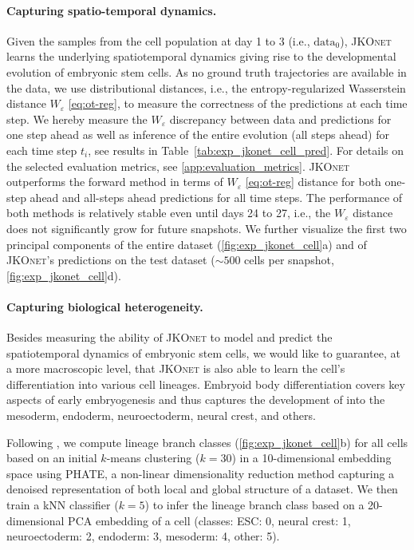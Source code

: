\paragraph{Capturing spatio-temporal dynamics.}
Given the samples from the cell population at day 1 to 3 (i.e., $\mathrm{data}_0$), \textsc{JKOnet} learns the underlying spatiotemporal dynamics giving rise to the developmental evolution of embryonic stem cells. 
As no ground truth trajectories are available in the data, we use distributional distances, i.e., the entropy-regularized Wasserstein distance $W_\varepsilon$ \eqref{eq:ot-reg}, to measure the correctness of the predictions at each time step. 
We hereby measure the $W_\varepsilon$ discrepancy between data and predictions for one step ahead as well as inference of the entire evolution (all steps ahead) for each time step $t_i$, see results in Table~\ref{tab:exp_jkonet_cell_pred}. For details on the selected evaluation metrics, see \cref{app:evaluation_metrics}. \textsc{JKOnet} outperforms the forward method in terms of $W_\varepsilon$ \eqref{eq:ot-reg} distance for both one-step ahead and all-steps ahead predictions for all time steps. 
The performance of both methods is relatively stable even until days 24 to 27, i.e., the $W_\varepsilon$ distance does not significantly grow for future snapshots.
We further visualize the first two principal components of the entire dataset (\cref{fig:exp_jkonet_cell}a) and of \textsc{JKOnet}'s predictions on the test dataset ($\sim 500$ cells per snapshot, \cref{fig:exp_jkonet_cell}d). 

\paragraph{Capturing biological heterogeneity.}
Besides measuring the ability of \textsc{JKOnet} to model and predict the spatiotemporal dynamics of embryonic stem cells, we would like to guarantee, at a more macroscopic level, that \textsc{JKOnet} is also able to learn the cell's differentiation into various cell lineages.
Embryoid body differentiation covers key aspects of early embryogenesis and thus captures the development of  into the mesoderm, endoderm, neuroectoderm, neural crest, and others.

Following \citet[Fig. 6, Suppl. Note 4]{moon2019visualizing}, we compute lineage branch classes (\cref{fig:exp_jkonet_cell}b) for all cells based on an initial $k$-means clustering ($k=30$) in a 10-dimensional embedding space using PHATE, a non-linear dimensionality reduction method capturing a denoised representation of both local and global structure of a dataset.
We then train a \acrfull{kNN} classifier ($k=5$) to infer the lineage branch class based on a 20-dimensional \acrshort{PCA} embedding of a cell (classes: ESC: 0, neural crest: 1, neuroectoderm: 2, endoderm: 3, mesoderm: 4, other: 5).

